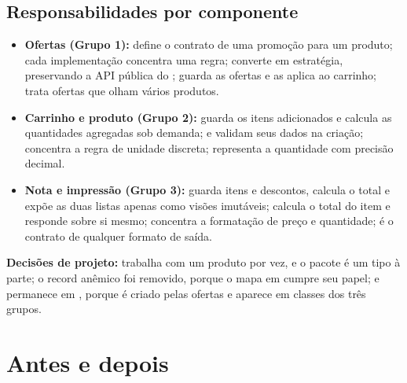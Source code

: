 \subsection{Responsabilidades por componente}

\begin{itemize}
\item \textbf{Ofertas (Grupo 1):}  define o contrato de uma promoção para um produto; cada implementação concentra uma regra;  converte  em estratégia, preservando a API pública do ;  guarda as ofertas e as aplica ao carrinho;  trata ofertas que olham vários produtos.
\item \textbf{Carrinho e produto (Grupo 2):}  guarda os itens adicionados e calcula as quantidades agregadas sob demanda;  e  validam seus dados na criação;  concentra a regra de unidade discreta;  representa a quantidade com precisão decimal.
\item \textbf{Nota e impressão (Grupo 3):}  guarda itens e descontos, calcula o total e expõe as duas listas apenas como visões imutáveis;  calcula o total do item e responde sobre si mesmo;  concentra a formatação de preço e quantidade;  é o contrato de qualquer formato de saída.
\end{itemize}

\textbf{Decisões de projeto:}  trabalha com um produto por vez, e o pacote é um tipo à parte; o record anêmico  foi removido, porque o mapa em  cumpre seu papel; e  permanece em , porque é criado pelas ofertas e aparece em classes dos três grupos.

\section{Antes e depois}

